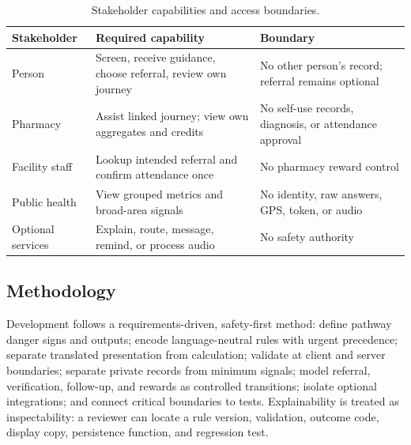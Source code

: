 \documentclass[12pt,onecolumn]{IEEEtran}
\begin{document}
\begin{table}[H]
\caption{Stakeholder capabilities and access boundaries.}\label{tab:stakeholders}\centering\small
\begin{tabularx}{\textwidth}{p{}X X}
\toprule Stakeholder & Required capability & Boundary \\\midrule
Person & Screen, receive guidance, choose referral, review own journey & No other person's record; referral remains optional \\
Pharmacy & Assist linked journey; view own aggregates and credits & No self-use records, diagnosis, or attendance approval \\
Facility staff & Lookup intended referral and confirm attendance once & No pharmacy reward control \\
Public health & View grouped metrics and broad-area signals & No identity, raw answers, GPS, token, or audio \\
Optional services & Explain, route, message, remind, or process audio & No safety authority \\
\bottomrule
\end{tabularx}
\end{table}

\subsection{Methodology}
Development follows a requirements-driven, safety-first method: define pathway danger signs and outputs; encode language-neutral rules with urgent precedence; separate translated presentation from calculation; validate at client and server boundaries; separate private records from minimum signals; model referral, verification, follow-up, and rewards as controlled transitions; isolate optional integrations; and connect critical boundaries to tests. Explainability is treated as inspectability: a reviewer can locate a rule version, validation, outcome code, display copy, persistence function, and regression test.
\end{document}
